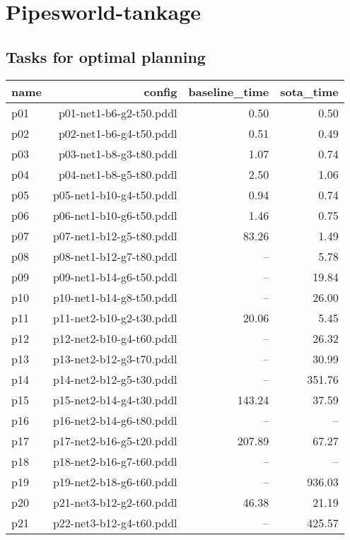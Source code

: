 \documentclass{article}
\begin{document}
                \newpage \section{Pipesworld-tankage}
                    \subsection*{Tasks for optimal planning}
                    
                            \begin{center}
                            \scriptsize
                            \begin{tabular}{@{}l|r|r|r@{}}
                            name & config & baseline\_time & sota\_time\\\midrule
                              p01& p01-net1-b6-g2-t50.pddl&0.50&0.50\\
  p02& p02-net1-b6-g4-t50.pddl&0.51&0.49\\
  p03& p03-net1-b8-g3-t80.pddl&1.07&0.74\\
  p04& p04-net1-b8-g5-t80.pddl&2.50&1.06\\
  p05& p05-net1-b10-g4-t50.pddl&0.94&0.74\\
  p06& p06-net1-b10-g6-t50.pddl&1.46&0.75\\
  p07& p07-net1-b12-g5-t80.pddl&83.26&1.49\\
  p08& p08-net1-b12-g7-t80.pddl&--&5.78\\
  p09& p09-net1-b14-g6-t50.pddl&--&19.84\\
  p10& p10-net1-b14-g8-t50.pddl&--&26.00\\
  p11& p11-net2-b10-g2-t30.pddl&20.06&5.45\\
  p12& p12-net2-b10-g4-t60.pddl&--&26.32\\
  p13& p13-net2-b12-g3-t70.pddl&--&30.99\\
  p14& p14-net2-b12-g5-t30.pddl&--&351.76\\
  p15& p15-net2-b14-g4-t30.pddl&143.24&37.59\\
  p16& p16-net2-b14-g6-t80.pddl&--&--\\
  p17& p17-net2-b16-g5-t20.pddl&207.89&67.27\\
  p18& p18-net2-b16-g7-t60.pddl&--&--\\
  p19& p19-net2-b18-g6-t60.pddl&--&936.03\\
  p20& p21-net3-b12-g2-t60.pddl&46.38&21.19\\
  p21& p22-net3-b12-g4-t60.pddl&--&425.57\\

\end{tabular}
\end{center}
\end{document}
